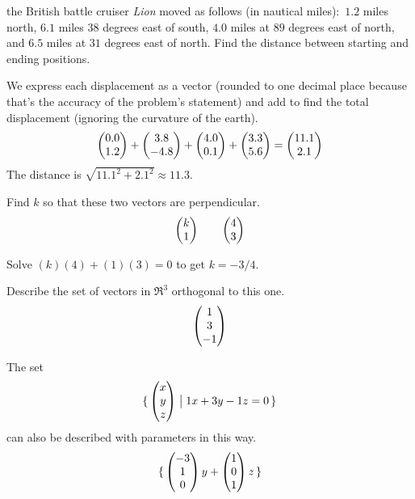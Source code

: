 \begin{exercises}
    the British battle cruiser \textit{Lion} moved as follows (in nautical
    miles):~\( 1.2 \) miles north, \( 6.1 \) miles \( 38 \) degrees
    east of south, \( 4.0 \) miles at \( 89 \) degrees east of
    north, and \( 6.5 \) miles at \( 31 \) degrees east of north.
    Find the distance between starting and ending positions.
    \cite{Ohanian}
    \begin{answer}
      We express each displacement as a vector (rounded to one
      decimal place because that's the accuracy of the problem's statement)
      and add to find the total displacement 
      (ignoring the curvature of the earth).
      \begin{equation*}
        \begin{pmatrix} 0.0 \\ 1.2 \end{pmatrix}
        +\begin{pmatrix} 3.8 \\ -4.8 \end{pmatrix}
        +\begin{pmatrix} 4.0 \\ 0.1 \end{pmatrix}
        +\begin{pmatrix} 3.3 \\ 5.6 \end{pmatrix}
        =\begin{pmatrix} 11.1 \\ 2.1 \end{pmatrix}
      \end{equation*}
      The distance is \( \sqrt{11.1^2+2.1^2}\approx 11.3 \).  
    \end{answer}
  \item 
    Find \( k \) so that these two vectors are perpendicular.
    \begin{equation*}
       \begin{pmatrix} k \\ 1 \end{pmatrix}
       \qquad
       \begin{pmatrix} 4 \\ 3 \end{pmatrix}
    \end{equation*}
    \begin{answer}
       Solve \( (k)(4)+(1)(3)=0 \) to get \( k=-3/4 \).  
    \end{answer}
  \item 
    Describe the set of vectors in \( \Re^3 \) orthogonal to this one.
    \begin{equation*}
      \begin{pmatrix} 1 \\ 3 \\ -1 \end{pmatrix}
    \end{equation*}
    \begin{answer}
      The set
      \begin{equation*}
         \mbox{$\{\,\begin{pmatrix} x \\ y \\ z \end{pmatrix}\bigm| 1x+3y-1z=0\,\}$}
      \end{equation*}
      can also be described with parameters in this way.
      \begin{equation*}
         \mbox{$\{\,\begin{pmatrix} -3 \\ 1 \\ 0 \end{pmatrix}y+\begin{pmatrix} 1 \\ 0 \\ 1 \end{pmatrix}z
\,\}$}
\end{equation*}
\end{answer}
\end{exercises}
